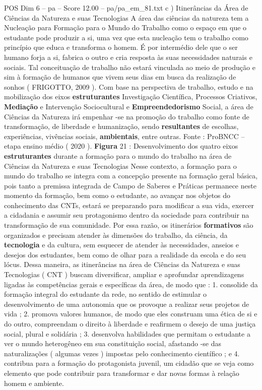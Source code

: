 \begin{textsample}{POS Dim 6 – pa – Score 12.00 – pa/pa\_em\_81.txt}  \label{ex:f6_pos_061}
c ) Itinerâncias da Área de Ciências da Natureza e suas Tecnologias A área das ciências da natureza tem a Nucleação para Formação para o Mundo do Trabalho como o espaço em que o estudante pode produzir a si, uma vez que esta nucleação tem o trabalho como princípio que educa e transforma o homem.
É por intermédio dele que o ser humano forja a si, fabrica o outro e cria resposta às suas necessidades naturais e sociais.
Tal conceituação de trabalho não estará vinculada ao meio de produção e sim à formação de humanos que vivem seus dias em busca da realização de sonhos ( FRIGOTTO, 2009 ).
Com base na perspectiva de trabalho, estudo e na mobilização dos eixos \textbf{estruturantes} Investigação Científica, Processos Criativos, \textbf{Mediação} e Intervenção Sociocultural e \textbf{Empreendedorismo} Social, a área de Ciências da Natureza irá empenhar -se na promoção do trabalho como fonte de transformação, de liberdade e humanização, sendo \textbf{resultantes} de escolhas, experiências, vivências sociais, \textbf{ambientais}, entre outras.
Fonte : ProBNCC – etapa ensino médio ( 2020 ). \textbf{Figura} 21 : Desenvolvimento dos quatro eixos \textbf{estruturantes} durante a formação para o mundo do trabalho na área de Ciências da Natureza e suas Tecnologias Nesse contexto, a formação para o mundo do trabalho se integra com a concepção presente na formação geral básica, pois tanto a premissa integrada de Campo de Saberes e Práticas permanece neste momento da formação, bem como o estudante, ao avançar nos objetos do conhecimento das CNTs, estará se preparando para modificar a sua vida, exercer a cidadania e assumir seu protagonismo dentro da sociedade para contribuir na transformação de sua comunidade.
Por essa razão, os itinerários \textbf{formativos} são organizados e precisam atender às dimensões do trabalho, da ciência, da \textbf{tecnologia} e da cultura, sem esquecer de atender às necessidades, anseios e desejos dos estudantes, bem como de olhar para a realidade da escola e do seu lócus.
Dessa maneira, as itinerâncias na área de Ciências da Natureza e suas Tecnologias ( CNT ) buscam diversificar, ampliar e aprofundar aprendizagens ligadas às competências gerais e específicas da área, de modo que : 1. consolide da formação integral do estudante da rede, no sentido de estimular o desenvolvimento de uma autonomia que os provoque a realizar seus projetos de vida ; 2. promova valores humanos, de modo que eles construam uma ética de si e do outro, compreendam o direito à liberdade e reafirmem o desejo de uma justiça social, plural e solidária ; 3. desenvolva habilidades que permitam o estudante a ver o mundo heterogêneo em sua constituição social, afastando -se das naturalizações ( algumas vezes ) impostas pelo conhecimento científico ; e 4. contribua para a formação do protagonista juvenil, um cidadão que se veja como elemento que pode contribuir para transformar e dar novas formas à relação homem e ambiente.

\end{textsample}
